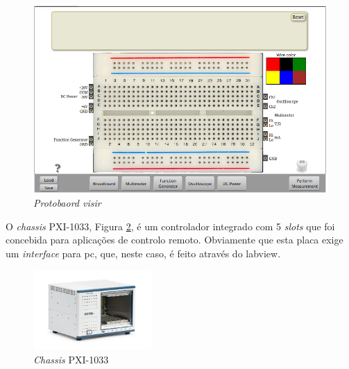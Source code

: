\begin{figure}[hbtp]
    \centering
    \includegraphics[width=0.4\linewidth]{figures/protboard_visir.png}
    \caption{\textit{Protobaord \acrshort{visir}}}
    \label{fig:protboard_visir}
\end{figure}

O \textit{chassis}  PXI-1033\cite{PXI-1033}, Figura \ref{fig:PXI-1033}, é um controlador integrado com 5 \textit{slots} que foi concebida para aplicações de controlo remoto. Obviamente que esta placa exige um \textit{interface} para \acrshort{pc}, que, neste caso, é feito através do \acrshort{labview}.

\begin{figure}[hbtp]
    \centering
    \includegraphics[width=0.4\textwidth]{figures/PXI-1033.png}
    \caption{\textit{Chassis} PXI-1033 \cite{PXI-1033}}
    \label{fig:PXI-1033}
\end{figure}

